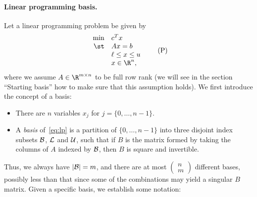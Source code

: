 \paragraph{Linear programming basis.}

Let a linear programming problem be given by
\begin{equation}
\begin{array}{rl}
\min & c^T x \\
\st  & A x = b \\
     & \ell \leq x \leq u \\
     & x \in \R^n,
\end{array}
\tag{P}
\label{eq:lp}
\end{equation}
where we assume $A \in \R^{m \times n}$ to be full row rank
(we will see in the section ``Starting basis'' how to make
sure that this assumption holds).
We first introduce the concept of a basis:
\begin{itemize}
\item There are $n$ variables $x_j$ for $j = \{ 0, \ldots, n-1 \}$.
\item A \emph{basis} of~\eqref{eq:lp} is a partition of
$\{ 0, \ldots, n-1 \}$ into three disjoint index subsets
$\mathcal{B}$, $\mathcal{L}$ and $\mathcal{U}$, such that
if $B$ is the matrix formed by taking
the columns of $A$ indexed by $\mathcal{B}$, then $B$ is square and
invertible.
\end{itemize}
Thus, we always have $|\mathcal{B}| = m$, and there are at most
$\left( \begin{smallmatrix} n \\ m \end{smallmatrix} \right)$ different
bases, possibly less than that since some of the combinations
may yield a singular $B$ matrix.
Given a specific basis, we establish some notation: 
